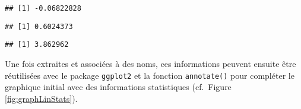 \documentclass[
  french,
]{book}
\newenvironment{Shaded}{\begin{snugshade}}{\end{snugshade}}
\newcommand{\CommentTok}[1]{\textcolor[rgb]{0.56,0.35,0.01}{\textit{#1}}}
\newcommand{\KeywordTok}[1]{\textcolor[rgb]{0.13,0.29,0.53}{\textbf{#1}}}
\newcommand{\NormalTok}[1]{#1}
\newcommand{\OperatorTok}[1]{\textcolor[rgb]{0.81,0.36,0.00}{\textbf{#1}}}
\newcommand{\StringTok}[1]{\textcolor[rgb]{0.31,0.60,0.02}{#1}}
\begin{document}
\begin{verbatim}
## [1] -0.06822828
\end{verbatim}

\begin{Shaded}
\end{Shaded}

\begin{verbatim}
## [1] 0.6024373
\end{verbatim}

\begin{Shaded}
\end{Shaded}

\begin{verbatim}
## [1] 3.862962
\end{verbatim}

Une fois extraites et associées à des noms, ces informations peuvent ensuite être réutilisées avec le package \texttt{ggplot2} et la fonction \texttt{annotate()} pour compléter le graphique initial avec des informations statistiques (cf.~Figure \ref{fig:graphLinStats}).
\end{document}
